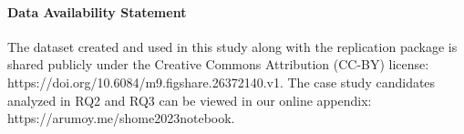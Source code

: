 \documentclass[smallextended]{svjour3}       %
\begin{document}
\paragraph{\textbf{Data Availability Statement}} The dataset created and used in this study along with the replication package is shared publicly under the Creative Commons Attribution (CC-BY) license: https://doi.org/10.6084/m9.figshare.26372140.v1. The case study candidates analyzed in RQ2 and RQ3 can be viewed in our online appendix: https://arumoy.me/shome2023notebook.

\end{document}
